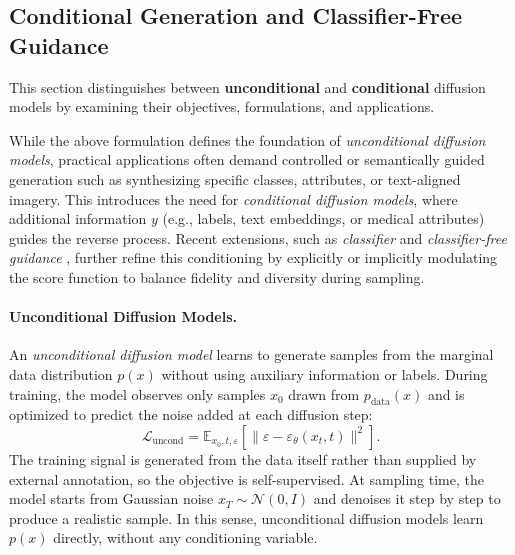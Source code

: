 \subsection{Conditional Generation and Classifier-Free Guidance}

This section distinguishes between \textbf{unconditional} and \textbf{conditional} diffusion models by examining their objectives, formulations, and applications.

While the above formulation defines the foundation of \emph{unconditional diffusion models}, practical applications often demand controlled or semantically guided generation such as synthesizing specific classes, attributes, or text-aligned imagery.
This introduces the need for \emph{conditional diffusion models}, where additional information \(y\) (e.g., labels, text embeddings, or medical attributes) guides the reverse process.
Recent extensions, such as \emph{classifier} \citep{NEURIPS2021_49ad23d1} and \emph{classifier-free guidance} \citep{ho2022classifier}, further refine this conditioning by explicitly or implicitly modulating the score function to balance fidelity and diversity during sampling.

\paragraph{Unconditional Diffusion Models.}
An \textit{unconditional diffusion model} learns to generate samples from the marginal data distribution \(p(x)\) without using auxiliary information or labels. During training, the model observes only samples \(x_0\) drawn from \(p_{\text{data}}(x)\) and is optimized to predict the noise added at each diffusion step:
\begin{equation}
\mathcal{L}_{\text{uncond}} = \mathbb{E}_{x_0, t, \varepsilon}\!\left[\|\varepsilon - \varepsilon_\theta(x_t, t)\|^2\right].
\end{equation}
The training signal is generated from the data itself rather than supplied by external annotation, so the objective is self-supervised. At sampling time, the model starts from Gaussian noise \(x_T \sim \mathcal{N}(0, I)\) and denoises it step by step to produce a realistic sample. In this sense, unconditional diffusion models learn \(p(x)\) directly, without any conditioning variable.

